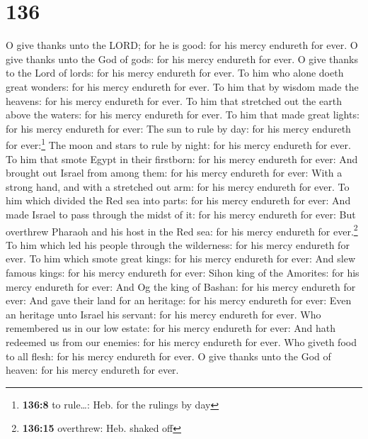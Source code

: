 \hypertarget{section-137}{%
\section{136}\label{section-137}}

 O give thanks unto the LORD; for he is good: for his
mercy endureth for ever.  O give thanks unto the God of
gods: for his mercy endureth for ever.  O give thanks to
the Lord of lords: for his mercy endureth for ever.  To
him who alone doeth great wonders: for his mercy endureth for ever.
 To him that by wisdom made the heavens: for his mercy
endureth for ever.  To him that stretched out the earth
above the waters: for his mercy endureth for ever.  To him
that made great lights: for his mercy endureth for ever: 
The sun to rule by day: for his mercy endureth for ever:\footnote{\textbf{136:8}
  to rule\ldots: Heb. for the rulings by day}  The moon
and stars to rule by night: for his mercy endureth for ever.
 To him that smote Egypt in their firstborn: for his
mercy endureth for ever:  And brought out Israel from
among them: for his mercy endureth for ever:  With a
strong hand, and with a stretched out arm: for his mercy endureth for
ever.  To him which divided the Red sea into parts: for
his mercy endureth for ever:  And made Israel to pass
through the midst of it: for his mercy endureth for ever:
 But overthrew Pharaoh and his host in the Red sea: for
his mercy endureth for ever.\footnote{\textbf{136:15} overthrew: Heb.
  shaked off}  To him which led his people through the
wilderness: for his mercy endureth for ever.  To him
which smote great kings: for his mercy endureth for ever:
 And slew famous kings: for his mercy endureth for ever:
 Sihon king of the Amorites: for his mercy endureth for
ever:  And Og the king of Bashan: for his mercy endureth
for ever:  And gave their land for an heritage: for his
mercy endureth for ever:  Even an heritage unto Israel
his servant: for his mercy endureth for ever.  Who
remembered us in our low estate: for his mercy endureth for ever:
 And hath redeemed us from our enemies: for his mercy
endureth for ever.  Who giveth food to all flesh: for his
mercy endureth for ever.  O give thanks unto the God of
heaven: for his mercy endureth for ever.

